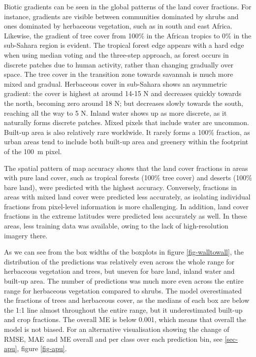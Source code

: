 \documentclass[review,authoryear,3p]{elsarticle}
\begin{document}
Biotic gradients can be seen in the global patterns of the land cover fractions.
For instance, gradients are visible between communities dominated by shrubs and ones dominated by herbaceous vegetation, such as in south and east Africa.
Likewise, the gradient of tree cover from 100\% in the African tropics to 0\% in the sub-Sahara region is evident.
The tropical forest edge appears with a hard edge when using median voting and the three-step approach, as forest occurs in discrete patches due to human activity, rather than changing gradually over space.
The tree cover in the transition zone towards savannah is much more mixed and gradual.
Herbaceous cover in sub-Sahara shows an asymmetric gradient: the cover is highest at around 14-15\textdegree{} N and decreases quickly towards the north, becoming zero around 18\textdegree{} N; but decreases slowly towards the south, reaching all the way to 5\textdegree{} N.
Inland water shows up as more discrete, as it naturally forms discrete patches.
Mixed pixels that include water are uncommon.
Built-up area is also relatively rare worldwide.
It rarely forms a 100\% fraction, as urban areas tend to include both built-up area and greenery within the footprint of the 100~m pixel.

The spatial pattern of map accuracy shows that the land cover fractions in areas with pure land cover, such as tropical forests (100\% tree cover) and deserts (100\% bare land), were predicted with the highest accuracy.
Conversely, fractions in areas with mixed land cover were predicted less accurately, as isolating individual fractions from pixel-level information is more challenging.
In addition, land cover fractions in the extreme latitudes were predicted less accurately as well.
In these areas, less training data was available, owing to the lack of high-resolution imagery there.

As we can see from the box widths of the boxplots in figure \ref{fig-walltowall}, the distribution of the predictions was relatively even across the whole range for herbaceous vegetation and trees, but uneven for bare land, inland water and built-up area.
The number of predictions was much more even across the entire range for herbaceous vegetation compared to shrubs.
The model overestimated the fractions of trees and herbaceous cover, as the medians of each box are below the 1:1 line almost throughout the entire range, but it underestimated built-up and crop fractions.
The overall \gls{ME} is below 0.001, which means that overall the model is not biased.
For an alternative visualisation showing the change of \gls{RMSE}, \gls{MAE} and \gls{ME} overall and per class over each prediction bin, see \ref{sec-apu}, figure \ref{fig-apu}.
\end{document}
